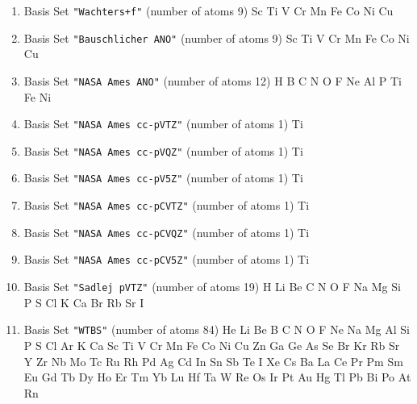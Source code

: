 \begin{enumerate}
\item Basis Set \verb#"Wachters+f"# (number of atoms 9)  \newline
  Sc Ti V Cr Mn Fe Co Ni Cu


\item Basis Set \verb#"Bauschlicher ANO"# (number of atoms 9)  \newline
  Sc Ti V Cr Mn Fe Co Ni Cu

\item Basis Set \verb#"NASA Ames ANO"# (number of atoms 12)  \newline
  H B C N O F Ne Al P Ti Fe Ni


\item Basis Set \verb#"NASA Ames cc-pVTZ"# (number of atoms 1)  \newline
  Ti


\item Basis Set \verb#"NASA Ames cc-pVQZ"# (number of atoms 1)  \newline
  Ti


\item Basis Set \verb#"NASA Ames cc-pV5Z"# (number of atoms 1)  \newline
  Ti


\item Basis Set \verb#"NASA Ames cc-pCVTZ"# (number of atoms 1)  \newline
  Ti


\item Basis Set \verb#"NASA Ames cc-pCVQZ"# (number of atoms 1)  \newline
  Ti


\item Basis Set \verb#"NASA Ames cc-pCV5Z"# (number of atoms 1)  \newline
  Ti


\item Basis Set \verb#"Sadlej pVTZ"# (number of atoms 19)  \newline
  H Li Be C N O F Na Mg Si P S Cl K Ca Br Rb Sr I


\item Basis Set \verb#"WTBS"# (number of atoms 84)  \newline
  He Li Be B C N O F Ne Na Mg Al Si P S Cl Ar K Ca Sc Ti V Cr Mn Fe
 Co Ni Cu Zn Ga Ge As Se Br Kr Rb Sr Y Zr Nb Mo Tc Ru Rh Pd Ag Cd In Sn Sb
 Te I Xe Cs Ba La Ce Pr Pm Sm Eu Gd Tb Dy Ho Er Tm Yb Lu Hf Ta W Re Os Ir
 Pt Au Hg Tl Pb Bi Po At Rn

\end{enumerate}

